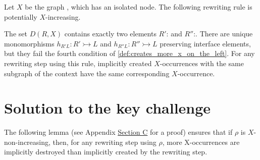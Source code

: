 \begin{example}
    \label{ex:cond4_necessaire}
    Let $X$ be the graph 
    , which has an isolated node. The following rewriting rule is potentially $X$-increasing.
    \begin{center}
    \end{center}
    The set \( D(R,X) \) contains exactly two elements $R'$:
     and $R''$:. 
    There are unique monomorphisms $h_{R'L}:R' \rightarrowtail L$ and $h_{R''L}:R'' \rightarrowtail L$ preserving interface elements, but they fail the fourth condition of \autoref{def:creates_more_x_on_the_left}.
    For any rewriting step using this rule, implicitly created $X$-occurrences with the same subgraph of the context have the same corresponding $X$-occurrence.
\end{example}


\section{Solution to the key challenge}
\label{sec:solution_to_the_key_challenge}
The following lemma (see \iflongversion
Appendix \hyperref[proof:lem:w_u_l_not_geq_r_not]{Section C}
\else
\cite[Lemma 40]{qiu2025termination}
\fi for a proof) ensures that if $\rho$ is $X$-non-increasing, then, for any rewriting step using $\rho$, 
more X-occurrences are implicitly destroyed than implicitly created by the rewriting step.

